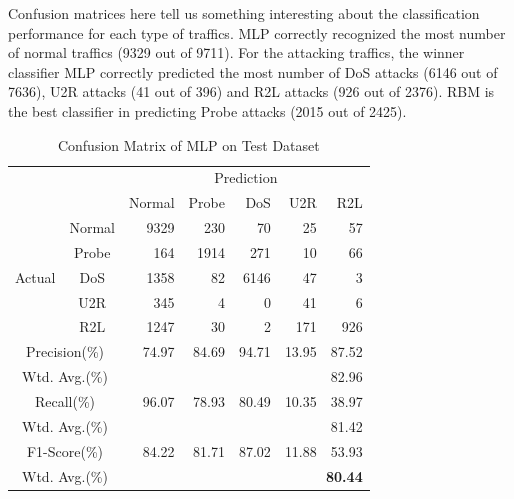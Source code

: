 Confusion matrices here tell us something interesting about the classification performance
for each type of traffics.
MLP correctly recognized the most number of normal traffics (9329 out of 9711).
For the attacking traffics, the winner classifier MLP correctly predicted the most
number of DoS attacks (6146 out of 7636), U2R attacks (41 out of 396)
and R2L attacks (926 out of 2376).
RBM is the best classifier in predicting Probe attacks (2015 out of 2425).


\begin{table}[t]
    \caption{Confusion Matrix of MLP on Test Dataset}
    \centering
    \begin{tabular}{cc|rrrrr}
        \hline
        &  & \multicolumn{5}{c}{Prediction} \\
                        &        & Normal & Probe & DoS & U2R & R2L\\
        \hline
        \hline
        \multirow{5}{*}{Actual} & Normal & {\color{red}9329} &  230 &   70 &  25 &  57 \\
                                &  Probe &  164 & 1914 &  271 &  10 &  66 \\
                                &  DoS   & 1358 &   82 & {\color{red}6146} &  47 &   3 \\
                                &  U2R   &  345 &    4 &    0 &  {\color{red}41} &   6 \\
                                &  R2L   & 1247 &   30 &    2 & 171 & {\color{red}926} \\
        \hline
        \multicolumn{2}{c|}{Precision(\%)}   & 74.97 & 84.69 & 94.71 & 13.95 & 87.52\\
        \multicolumn{2}{c|}{Wtd. Avg.(\%)}   & \multicolumn{5}{r}{82.96}\\
        \hline
        \multicolumn{2}{c|}{Recall(\%)}      & 96.07 & 78.93 & 80.49 & 10.35 & 38.97\\
        \multicolumn{2}{c|}{Wtd. Avg.(\%)}   & \multicolumn{5}{r}{81.42}\\
        \hline
        \multicolumn{2}{c|}{F1-Score(\%)}    & 84.22 & 81.71 & 87.02 & 11.88 & 53.93\\
        \multicolumn{2}{c|}{Wtd. Avg.(\%)}   & \multicolumn{5}{r}{\textbf{\color{red}80.44}}\\
        \hline
    \end{tabular}
    \label{Tab:ConfusionMatrixMLP}
\end{table}


